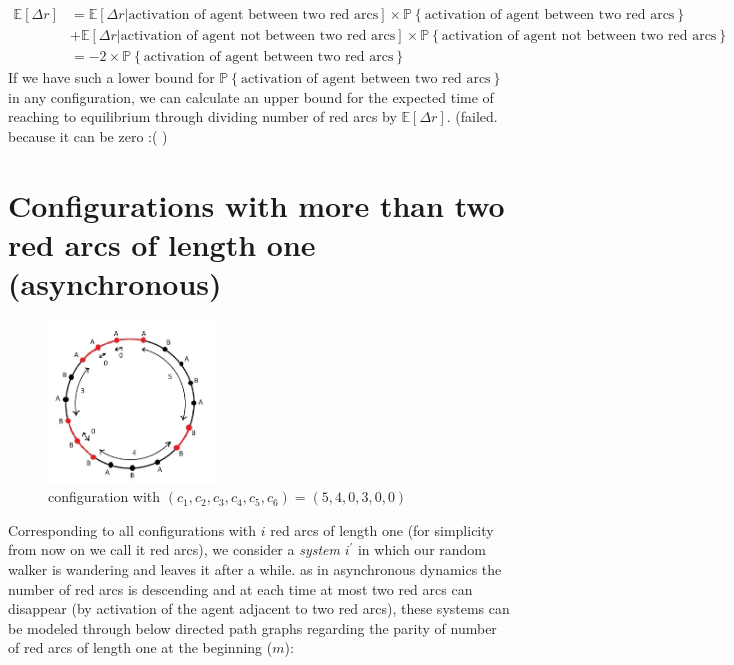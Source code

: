 \documentclass[]{book}
\theoremstyle{definition}
\begin{document}
\begin{equation}
\begin{split}
    \mathbb{E}[\Delta r] &= \mathbb{E}[\Delta r | \text{activation of agent between two red arcs}] \times \mathbb{P}\left\{ \text{activation of agent between two red arcs} \right\} \\
    &+ \mathbb{E}[\Delta r | \text{activation of agent not between two red arcs}] \times \mathbb{P}\left\{ \text{activation of agent not between two red arcs} \right\} \\
    &= -2\times \mathbb{P}\left\{ \text{activation of agent between two red arcs} \right\}
\end{split}
\end{equation}
If we have such a lower bound for $\mathbb{P}\left\{ \text{activation of agent between two red arcs} \right\}$ in any configuration, we can calculate an upper bound for the expected time of reaching to equilibrium through dividing number of red arcs by $\mathbb{E}[\Delta r]$. (failed. because it can be zero :( )

\newpage
\vspace{0.2 cm}
\section{Configurations with more than two red arcs of length one (asynchronous)}
\begin{figure}[H]
    \centering
    \includegraphics[width=0.4\textwidth]{figures/pic2.jpg}
    \caption{configuration with $\left(c_{1}, c_{2}, c_{3}, c_{4}, c_{5}, c_{6}\right) = \left(5, 4, 0, 3, 0, 0\right)$}
    \label{fig:mesh2}
\end{figure}
Corresponding to all configurations with $i$ red arcs of length one (for simplicity from now on we call it red arcs), we consider a \emph{system} $i^\prime$ in which our random walker is wandering and leaves it after a while. as in asynchronous dynamics the number of red arcs is descending and at each time at most two red arcs can disappear (by activation of the agent adjacent to two red arcs), these systems can be modeled through below directed path graphs regarding the parity of number of red arcs of length one at the beginning ($m$):
\end{document}
